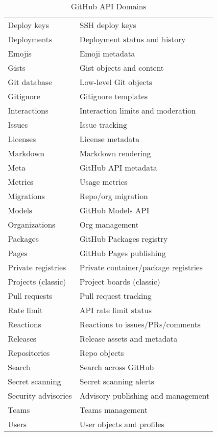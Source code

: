 \documentclass[openany, 12pt]{book}
\begin{document}
\begin{table}[h]
\begin{tabular}{ll}
		Deploy keys            & SSH deploy keys                      \\
		Deployments            & Deployment status and history        \\
		Emojis                 & Emoji metadata                       \\
		Gists                  & Gist objects and content             \\
		Git database           & Low-level Git objects                \\
		Gitignore              & Gitignore templates                  \\
		Interactions           & Interaction limits and moderation    \\
		Issues                 & Issue tracking                       \\
		Licenses               & License metadata                     \\
		Markdown               & Markdown rendering                   \\
		Meta                   & GitHub API metadata                  \\
		Metrics                & Usage metrics                        \\
		Migrations             & Repo/org migration                   \\
		Models                 & GitHub Models API                    \\
		Organizations          & Org management                       \\
		Packages               & GitHub Packages registry             \\
		Pages                  & GitHub Pages publishing              \\
		Private registries     & Private container/package registries \\
		Projects (classic)     & Project boards (classic)             \\
		Pull requests          & Pull request tracking                \\
		Rate limit             & API rate limit status                \\
		Reactions              & Reactions to issues/PRs/comments     \\
		Releases               & Release assets and metadata          \\
		Repositories           & Repo objects                         \\
		Search                 & Search across GitHub                 \\
		Secret scanning        & Secret scanning alerts               \\
		Security advisories    & Advisory publishing and management   \\
		Teams                  & Teams management                     \\
		Users                  & User objects and profiles            \\
		\bottomrule
	\end{tabular}
	\caption{GitHub API Domains}
\end{table}
\end{document}

